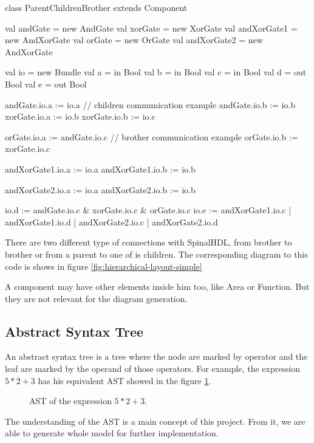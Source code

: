 \begin{listing}
    \centering
    \begin{scalacode}
    class ParentChildrenBrother extends Component
    {
        val andGate = new AndGate
        val xorGate = new XorGate
        val andXorGate1 = new AndXorGate
        val orGate = new OrGate
        val andXorGate2 = new AndXorGate

        val io = new Bundle
        {
            val a = in Bool
            val b = in Bool
            val c = in Bool
            val d = out Bool
            val e = out Bool
        }

        andGate.io.a := io.a            // children communication example
        andGate.io.b := io.b
        xorGate.io.a := io.b
        xorGate.io.b := io.c

        orGate.io.a := andGate.io.c     // brother communication example
        orGate.io.b := xorGate.io.c     

        andXorGate1.io.a := io.a
        andXorGate1.io.b := io.b

        andXorGate2.io.a := io.a
        andXorGate2.io.b := io.b

        io.d := andGate.io.c & xorGate.io.c & orGate.io.c
        io.e := andXorGate1.io.c | andXorGate1.io.d | andXorGate2.io.c | andXorGate2.io.d
    }
    \end{scalacode}
    \caption[Type of connection in SpinalHDL]{There are two different type of
connections with SpinalHDL, from brother to brother or from a parent to
one of is children. The corresponding diagram to this code is shows in figure
\ref{fig:hierarchical-layout-simple}}
    \label{lst:HierarchicComponent-solo}
\end{listing}

A component may have other elements inside him too, like Area or Function. But
they are not relevant for the diagram generation.

\subsection{Abstract Syntax Tree}
\label{sub:Abstract Syntax Tree}

An abstract syntax tree is a tree where the node are marked by operator and the
leaf are marked by the operand of those operators. For example, the expression $5
* 2 + 3$ has his equivalent AST showed in the figure \ref{fig:ast-example}.

\begin{figure}[H]
    \centering
    \caption[Example of an AST]{AST of the expression $5 * 2 + 3$.}
    \label{fig:ast-example}
  \end{figure}

The understanding of the AST is a main concept of this project. From it, we are
able to generate whole model for further implementation.

